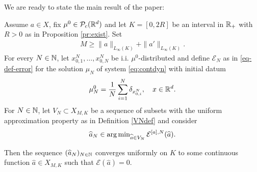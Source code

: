We are ready to state the main result of the paper:

\begin{theorem}\label{thm} Assume $a\in X$, fix $\mu^0 \in \mathcal{P}_c(\mathbb{R}^d)$ and let  $K=[0,2R]$ be an interval in $\mathbb{R}_+$ with $R>0$ as in Proposition \ref{pr:exist}.
	Set
	\begin{align*}
	M \geq \|a\|_{L_{\infty}(K)} + \|a'\|_{L_{\infty}(K)}.
	\end{align*}
	For every $N \in \mathbb{N}$, let $x^N_{0,1},\ldots,x^N_{0,N}$ be i.i. $\mu^0$-distributed and define $\mathcal E_N$ as in \eqref{eq-def-error} for the solution $\mu_N$ of system \eqref{eq:contdyn} with initial datum
	\begin{align*}
	\mu_N^0 = \frac{1}{N}\sum^N_{i = 1} \delta_{x^{N}_{0,i}}, \quad x \in \mathbb{R}^d.
	\end{align*}
	For  $N \in \mathbb{N}$, let $V_N\subset X_{M,K}$ be a sequence of subsets with the uniform approximation property as in Definition \ref{VNdef} and consider
	\begin{align*}
		\widehat a_N\in\operatorname{arg\,min}_{\widehat a\in V_N} \mathcal E^{[a],N}(\widehat a).
	\end{align*}
	
	Then the sequence $(\widehat a_{N})_{N \in \mathbb{N}}$ converges uniformly on $K$ to some continuous function $\widehat a \in X_{M,K}$ such that
	$\mathcal E(\widehat a)=0$. 
	

\end{theorem}
